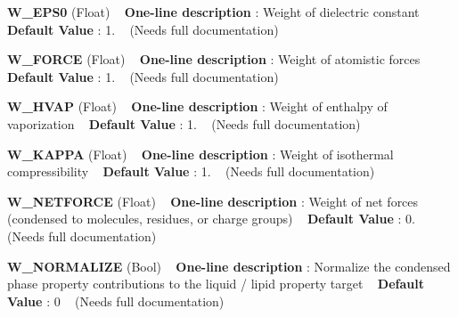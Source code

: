 \begin{DoxyItemize}
\item {\bfseries  W\+\_\+\+E\+P\+S0 } (Float) ~\newline
{\bfseries  One-\/line description }\+: Weight of dielectric constant ~\newline
{\bfseries  Default Value }\+: 1. ~\newline
(Needs full documentation)\end{DoxyItemize}
\begin{DoxyItemize}
\item {\bfseries  W\+\_\+\+F\+O\+R\+CE } (Float) ~\newline
{\bfseries  One-\/line description }\+: Weight of atomistic forces ~\newline
{\bfseries  Default Value }\+: 1. ~\newline
(Needs full documentation)\end{DoxyItemize}
\begin{DoxyItemize}
\item {\bfseries  W\+\_\+\+H\+V\+AP } (Float) ~\newline
{\bfseries  One-\/line description }\+: Weight of enthalpy of vaporization ~\newline
{\bfseries  Default Value }\+: 1. ~\newline
(Needs full documentation)\end{DoxyItemize}
\begin{DoxyItemize}
\item {\bfseries  W\+\_\+\+K\+A\+P\+PA } (Float) ~\newline
{\bfseries  One-\/line description }\+: Weight of isothermal compressibility ~\newline
{\bfseries  Default Value }\+: 1. ~\newline
(Needs full documentation)\end{DoxyItemize}
\begin{DoxyItemize}
\item {\bfseries  W\+\_\+\+N\+E\+T\+F\+O\+R\+CE } (Float) ~\newline
{\bfseries  One-\/line description }\+: Weight of net forces (condensed to molecules, residues, or charge groups) ~\newline
{\bfseries  Default Value }\+: 0. ~\newline
(Needs full documentation)\end{DoxyItemize}
\begin{DoxyItemize}
\item {\bfseries  W\+\_\+\+N\+O\+R\+M\+A\+L\+I\+ZE } (Bool) ~\newline
{\bfseries  One-\/line description }\+: Normalize the condensed phase property contributions to the liquid / lipid property target ~\newline
{\bfseries  Default Value }\+: 0 ~\newline
(Needs full documentation)\end{DoxyItemize}
